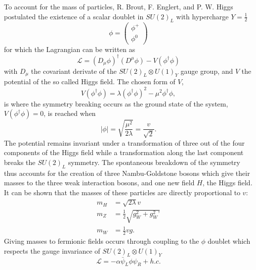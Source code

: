     To account for the mass of particles, R. Brout, F. Englert, and P. W. Higgs postulated the existence of a scalar doublet in $ SU(2)_L $ with hypercharge $ Y = \frac{1}{2} $
    \begin{equation}
      \phi = \left( \begin{matrix} \phi^+ \\ \phi^0 \end{matrix} \right)
    \end{equation}
    for which the Lagrangian can be written as
    \begin{equation}
      \mathcal{L} = \left( D_\mu \phi \right)^\dagger \left( D^\mu \phi \right) - V(\phi^\dagger \phi)
    \end{equation}
    with $ D_\mu $ the covariant derivate of the $ SU(2)_L \otimes U(1)_Y $ gauge group, and $ V $ the potential of the so called Higgs field. The chosen form of $ V $,
    \begin{equation}
      V(\phi^\dagger \phi) = \lambda \left( \phi^\dagger \phi \right)^2 - \mu^2 \phi^\dagger \phi ,
    \end{equation}
    is where the symmetry breaking occurs as the ground state of the system, $ V(\phi^\dagger \phi) = 0 $, is reached when
    \begin{equation}
      \left| \phi \right| = \sqrt{\frac{\mu^2}{2 \lambda}} = \frac{v}{\sqrt{2}} .
    \end{equation}
    The potential remains invariant under a transformation of three out of the four components of the Higgs field while a transformation along the last component breaks the $ SU(2)_L $ symmetry. The spontaneous breakdown of the symmetry thus accounts for the creation of three Nambu-Goldstone bosons which give their masses to the three weak interaction bosons, and one new field $ H $, the Higgs field. It can be shown that the masses of these particles are directly proportional to $ v $:
    \begin{align}
      m_H & = \sqrt{2 \lambda} v \\
      m_Z & = \frac{1}{2} \sqrt{g_W^2 + g_W^2\text{'}} \\
      m_W & = \frac{1}{2} v g .
    \end{align}
    Giving masses to fermionic fields occurs through coupling to the $ \phi $ doublet which respects the gauge invariance of $ SU(2)_L \otimes U(1)_Y $
    \begin{equation}
      \mathcal{L} = - \alpha \bar{\psi}_L \phi \psi_R + h.c.
    \end{equation} \\

